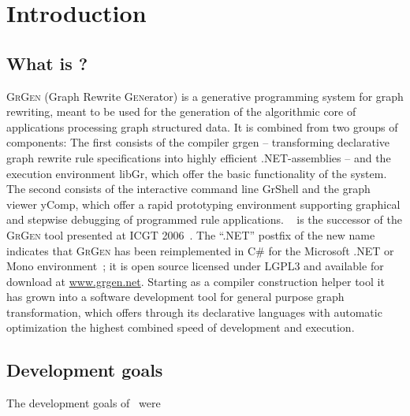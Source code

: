 \chapter{Introduction}
\label{chp:intro}


\section{What is \GrG?}

{\scshape GrGen} (\textsc{G}raph \textsc{R}ewrite \textsc{Gen}erator) is a generative programming system for graph rewriting,
meant to be used for the generation of the algorithmic core of applications processing graph structured data.
It is combined from two groups of components:
The first consists of the compiler grgen -- transforming declarative graph rewrite rule specifications into highly efficient .NET-assemblies --
and the execution environment libGr, which offer the basic functionality of the system. 
The second consists of the interactive command line GrShell and the graph viewer yComp,
which offer a rapid prototyping environment supporting graphical and stepwise debugging of programmed rule applications.
\GrG~\cite{grgen_web} is the successor of the \textsc{GrGen} tool presented at ICGT 2006~\cite{GBGHS:06}. 
The ``.NET'' postfix of the new name indicates that \textsc{GrGen} has been reimplemented in C\# for the Microsoft .NET or Mono environment~\cite{NET,MONO};
it is open source licensed under LGPL3 and available for download at \url{www.grgen.net}.
Starting as a compiler construction helper tool it has grown into a software development tool for general purpose graph transformation,
which offers through its declarative languages with automatic optimization the highest combined speed of development and execution.


\section{Development goals}

The development goals of \GrG\ were

